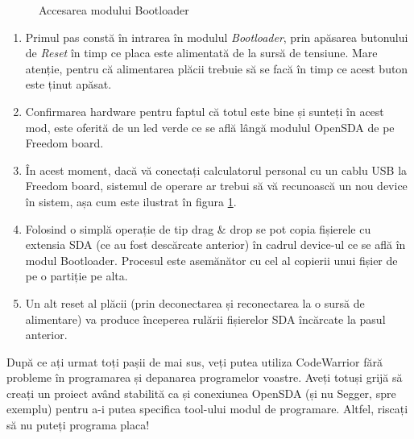 \begin{figure}
    \vspace{-25pt}
    \vspace{-20pt}
    \caption{\label{fig:CodeWarrior-OSDevice} Accesarea modului Bootloader}
    \vspace{-25pt}
\end{figure}

\begin{enumerate}
    \item Primul pas constă în intrarea în modulul \textit{Bootloader}, prin apăsarea butonului de \textit{Reset} în timp ce placa este alimentată de la sursă de tensiune. Mare atenție, pentru că alimentarea plăcii trebuie să se facă în timp ce acest buton este ținut apăsat.
    \item Confirmarea hardware pentru faptul că totul este bine și sunteți în acest mod, este oferită de un led verde ce se află lângă modulul OpenSDA de pe Freedom board.
    \item În acest moment, dacă vă conectați calculatorul personal cu un cablu USB la Freedom board, sistemul de operare ar trebui să vă recunoască un nou device în sistem, așa cum este ilustrat în figura \ref{fig:CodeWarrior-OSDevice}.
    \item Folosind o simplă operație de tip drag \& drop se pot copia fișierele cu extensia SDA (ce au fost descărcate anterior) în cadrul device-ul ce se află în modul Bootloader. Procesul este asemănător cu cel al copierii unui fișier de pe o partiție pe alta.
    \item Un alt reset al plăcii (prin deconectarea și reconectarea la o sursă de alimentare) va produce începerea rulării fișierelor SDA încărcate la pasul anterior.
\end{enumerate}

După ce ați urmat toți pașii de mai sus, veți putea utiliza CodeWarrior fără probleme în programarea și depanarea programelor voastre. Aveți totuși grijă să creați un proiect având stabilită ca și conexiunea OpenSDA (și nu Segger, spre exemplu) pentru a-i putea specifica tool-ului modul de programare. Altfel, riscați să nu puteți programa placa!

